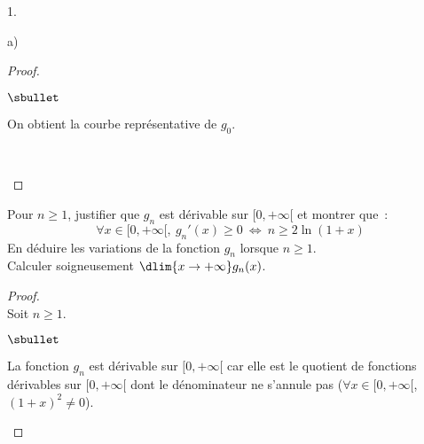 \documentclass[11pt]{article}%
\begin{document}
\begin{noliste}{1.}
\begin{noliste}{a)}
\begin{proof}
\begin{noliste}{$\sbullet$}
  \item On obtient la courbe représentative de $g_0$.
  
  \begin{center}
    \shorthandoff{;}
    \end{center}~\\[-1.4cm]
 \end{noliste}
\end{proof}






\item Pour $n \geq 1$, justifier que $g_n$ est dérivable sur
  $[0,+\infty[$ et montrer que~:
  \[ 
  \forall x \in [0,+\infty[, \ g_n'(x) \geq 0 \ \Leftrightarrow \ n
  \geq 2\ln(1+x)
  \]
  En déduire les variations de la fonction $g_n$ lorsque $n \geq 1$.\\ 
  Calculer soigneusement $\dlim{x \to + \infty} g_n(x)$.
  
  \begin{proof}~\\
    Soit $n\geq 1$.
    \begin{noliste}{$\sbullet$}
    \item La fonction $g_n$ est dérivable sur $[0,+\infty[$ car elle
      est le quotient de fonctions dérivables sur $[0,+\infty[$ dont
      le dénominateur ne s'annule pas ($\forall x \in [0,+\infty[$,
      $(1+x)^2 \neq 0$).
      

\end{noliste}
\end{proof}
\end{noliste}
\end{noliste}
\end{document}
